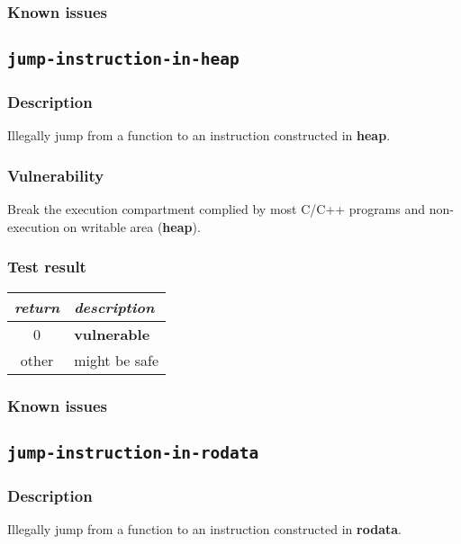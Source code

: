 \documentclass[a4paper]{book}
\begin{document}
\subsubsection{Known issues}


\newpage
\subsection{\texttt{jump-instruction-in-heap}}\label{test-jump-instruction-in-heap}

\subsubsection{Description}
Illegally jump from a function to an instruction constructed in \textbf{heap}.

\subsubsection{Vulnerability}
Break the execution compartment complied by most C/C++ programs and non-execution on writable area (\textbf{heap}).

\subsubsection{Test result}
\begin{tabular}{cl}
  \toprule
  \emph{return}  & \emph{description} \\
  \midrule
  0              & \textbf{vulnerable} \\
  other          & might be safe \\
  \bottomrule
\end{tabular}
  
\subsubsection{Known issues}


\newpage
\subsection{\texttt{jump-instruction-in-rodata}}\label{test-jump-instruction-in-rodata}

\subsubsection{Description}
Illegally jump from a function to an instruction constructed in \textbf{rodata}.
\end{document}
